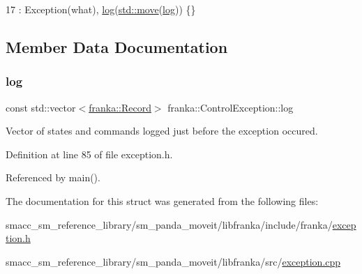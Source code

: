 \begin{DoxyCode}
17     : Exception(what), \hyperlink{structfranka_1_1ControlException_ae57f0ac0a9aa195057af1f1cc712b41e}{log}(\hyperlink{namespacefranka__gripper_a1356a87108d2229401d3755bd3e53bdf}{std::move}(\hyperlink{structfranka_1_1ControlException_ae57f0ac0a9aa195057af1f1cc712b41e}{log})) \{\}
\end{DoxyCode}


\subsection{Member Data Documentation}
\mbox{\label{structfranka_1_1ControlException_ae57f0ac0a9aa195057af1f1cc712b41e}} 
\subsubsection{\texorpdfstring{log}{log}}
{\footnotesize\ttfamily const std\+::vector$<$\hyperlink{structfranka_1_1Record}{franka\+::\+Record}$>$ franka\+::\+Control\+Exception\+::log}

Vector of states and commands logged just before the exception occured. 

Definition at line 85 of file exception.\+h.



Referenced by main().



The documentation for this struct was generated from the following files\+:\begin{DoxyCompactItemize}
\item 
smacc\+\_\+sm\+\_\+reference\+\_\+library/sm\+\_\+panda\+\_\+moveit/libfranka/include/franka/\hyperlink{exception_8h}{exception.\+h}\item 
smacc\+\_\+sm\+\_\+reference\+\_\+library/sm\+\_\+panda\+\_\+moveit/libfranka/src/\hyperlink{exception_8cpp}{exception.\+cpp}\end{DoxyCompactItemize}
